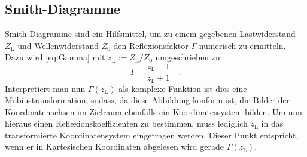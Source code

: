 \subsection{Smith-Diagramme}
Smith-Diagramme sind ein Hilfsmittel, um zu einem gegebenen Lastwiderstand 
$Z_\text{L}$ und Wellenwiderstand $Z_0$ den Reflexionsfaktor $\Gamma$ numerisch 
zu ermitteln. Dazu wird \eqref{eq:Gamma} mit $z_\text{L}:=Z_\text{L}/Z_0$ 
umgeschrieben zu
\begin{equation}
\Gamma = \frac{z_\text{L}-1}{z_\text{L}+1} \quad .
\end{equation}
Interpretiert man nun $\Gamma(z_\text{L})$ als komplexe Funktion ist dies eine 
Möbiustransformation, sodass, da diese Abbildung konform ist, die Bilder der 
Koordinatenachsen im Zielraum ebenfalls ein Koordinatessystem bilden. Um nun hieraus 
einen Reflexionskoeffizienten zu bestimmen, muss lediglich $z_\text{L}$ in das 
transformierte Koordinatensystem eingetragen werden. Dieser Punkt entspricht, wenn 
er in Kartesischen Koordinaten abgelesen wird gerade $\Gamma(z_\text{L})$.

